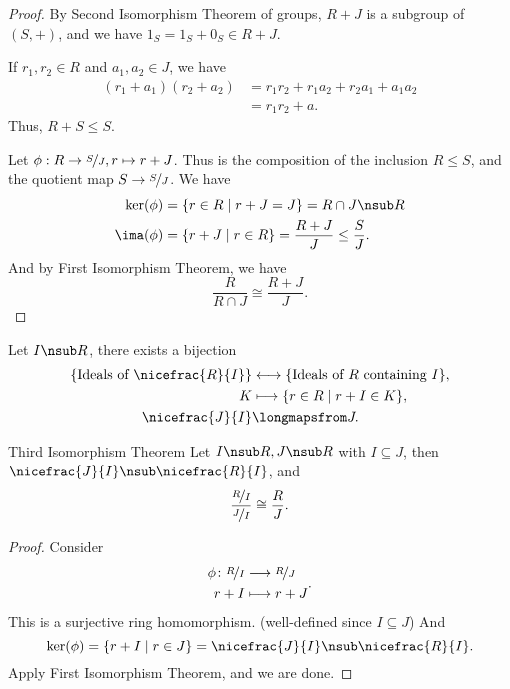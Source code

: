\begin{proof}
    By Second Isomorphism Theorem of groups, \(R + J\) is a subgroup of \((S, +)\), and we have \(1_S = 1_S + 0_S \in R + J\).

    If \(r_1, r_2 \in R\) and \(a_1, a_2 \in J\), we have
    \begin{align*}
        (r_1 + a_1)(r_2 + a_2) &= r_{1}r_2 +r_1 a_2 + r_2 a_1 + a_1 a_{2}\\
        &= r_1 r_2 + a.
    \end{align*}
    Thus, \(R+S \leq S\).

    Let \(\phi: R \to \nicefrac{S}{J}, r \mapsto r + J\). Thus is the composition of the inclusion \(R\leq S\), and the quotient map \(S \to \nicefrac{S}{J}\). We have
    \begin{align*}
        \ker(\phi) &= \{r\in R \mid r + J = J\} = R \cap J \nsub R\\
        \ima(\phi) &= \{r + J \mid r \in R\} = \frac{R + J}{J} \leq \frac{S}{J}.
    \end{align*}
    And by First Isomorphism Theorem, we have
    \[
        \frac{R}{R \cap J} \cong \frac{R + J}{J}.
    \]
\end{proof}
\begin{note}
    Let \(I \nsub R\), there exists a bijection
    \begin{align*}
        \{\text{Ideals of }\nicefrac{R}{I}\} &\longleftrightarrow\{\text{Ideals of }R\text{ containing }I\},\\
        K &\longmapsto \{r\in R\mid r + I \in K\},\\
        \nicefrac{J}{I}&\longmapsfrom J.
    \end{align*}
\end{note}
\begin{theorem}{Third Isomorphism Theorem}{}
    Let \(I\nsub R, J \nsub R\) with \(I \subseteq J\), then \(\nicefrac{J}{I}\nsub \nicefrac{R}{I}\), and
    \[
        \frac{\nicefrac{R}{I}}{\nicefrac{J}{I}}\cong \frac{R}{J}.
    \]
\end{theorem}
\begin{proof}
    Consider
    \[
    \begin{aligned}
      \phi\colon \nicefrac{R}{I} & \longrightarrow \nicefrac{R}{J}      \\
      r+I          & \longmapsto r+J
    \end{aligned}.
    \]
    This is a surjective ring homomorphism. (well-defined since \(I \subseteq J\)) And
    \[
        \ker(\phi) = \{r + I \mid r \in J\} = \nicefrac{J}{I} \nsub \nicefrac{R}{I}.
    \]
    Apply First Isomorphism Theorem, and we are done.
\end{proof}
